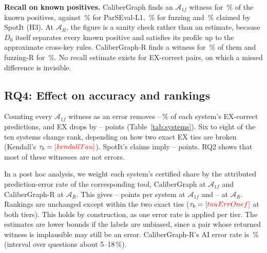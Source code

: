 \textbf{Recall on known positives.} CaliberGraph finds an $\mathcal A_{1f}$ witness for \,\% of the  known positives, against \,\% for ParSEval-L1, \,\% for fuzzing and \,\% claimed by SpotIt (H3). At $\mathcal A_R$, the figure is a sanity check rather than an estimate, because $D_0$ itself separates every known positive and satisfies its profile up to the approximate cross-key rules. CaliberGraph-R finds a witness for \,\% of them and fuzzing-R for \,\%. No recall estimate exists for EX-correct pairs, on which a missed difference is invisible.


\subsection{RQ4: Effect on accuracy and rankings}\label{sec:rankings}

\begin{table}[!htbp]
\centering\footnotesize
\caption{Per-system effect on the 1,174 test questions. Count-based: share of EX-correct predictions with a CaliberGraph $\mathcal A_{1f}$ witness, and EX after removing all of them (EX$'$). Count-based $\mathcal A_R$: points of EX removed by counting every CaliberGraph-R witness as an error (post hoc). Error-weighted, post hoc: certified share $\times$ attributed prediction-error rate (\,\% at $\mathcal A_{1f}$, \,\% at $\mathcal A_R$), in points of EX, which gives a lower bound.}\label{tab:systems}
\setlength{\tabcolsep}{3pt}
\end{table}

Counting every $\mathcal A_{1f}$ witness as an error removes --\,\% of each system's EX-correct predictions, and EX drops by -- points (Table~\ref{tab:systems}). Six to eight of the ten systems change rank, depending on how two exact EX ties are broken (Kendall's $\tau_b=\V{kendallTau}$). SpotIt's claims imply -- points. RQ2 shows that most of these witnesses are not errors.

In a post hoc analysis, we weight each system's certified share by the attributed prediction-error rate of the corresponding tool, CaliberGraph at $\mathcal A_{1f}$ and CaliberGraph-R at $\mathcal A_R$. This gives -- points per system at $\mathcal A_{1f}$ and -- at $\mathcal A_R$. Rankings are unchanged except within the two exact ties ($\tau_b=\V{tauErrOnef}$ at both tiers). This holds by construction, as one error rate is applied per tier. The estimates are lower bounds if the labels are unbiased, since a pair whose returned witness is implausible may still be an error. CaliberGraph-R's AI error rate is \,\% (interval over questions about 5--18\,\%).

